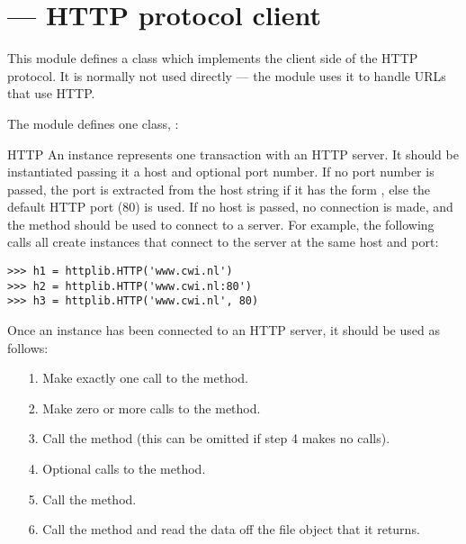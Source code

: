 \section{ ---
         HTTP protocol client}



This module defines a class which implements the client side of the
HTTP protocol.  It is normally not used directly --- the module
 uses it to handle URLs that
use HTTP.

The module defines one class, :

\begin{classdesc}{HTTP}{}
An  instance
represents one transaction with an HTTP server.  It should be
instantiated passing it a host and optional port number.  If no port
number is passed, the port is extracted from the host string if it has
the form , else the default HTTP port (80)
is used.  If no host is passed, no connection is made, and the
 method should be used to connect to a server.  For
example, the following calls all create instances that connect to the
server at the same host and port:

\begin{verbatim}
>>> h1 = httplib.HTTP('www.cwi.nl')
>>> h2 = httplib.HTTP('www.cwi.nl:80')
>>> h3 = httplib.HTTP('www.cwi.nl', 80)
\end{verbatim}

Once an  instance has been connected to an HTTP server, it
should be used as follows:

\begin{enumerate}

\item[1.] Make exactly one call to the  method.

\item[2.] Make zero or more calls to the  method.

\item[3.] Call the  method (this can be omitted if
step 4 makes no calls).

\item[4.] Optional calls to the  method.

\item[5.] Call the  method.

\item[6.] Call the  method and read the data off the
file object that it returns.

\end{enumerate}
\end{classdesc}

